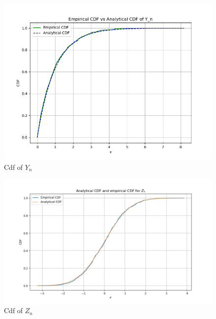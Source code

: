 \documentclass[journal,12pt,twocolumn]{IEEEtran}
\begin{document}
\begin{figure}[ht]
\includegraphics[width=\columnwidth]{2023/ST/61/figs/Figure_14.png}
\caption{Cdf of $Y_n$}
\label{fig:2023/ST/61/7}
\end{figure}
\begin{figure}[ht]
\includegraphics[width=\columnwidth]{2023/ST/61/figs/Figure_15.png}
\caption{Cdf of $Z_n$}
\label{fig:2023/ST/61/8}
\end{figure}
\end{document}
